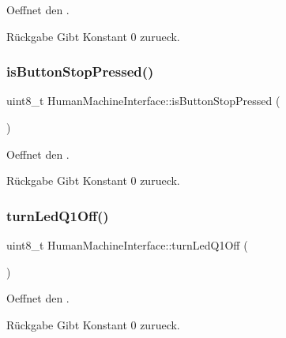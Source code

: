 Oeffnet den .

\begin{DoxyReturn}{Rückgabe}
Gibt Konstant 0 zurueck. 
\end{DoxyReturn}
\hypertarget{class_human_machine_interface_a6b150a5a2978b620a3823aaeda7e80b8}{}\label{class_human_machine_interface_a6b150a5a2978b620a3823aaeda7e80b8} 
\subsubsection{\texorpdfstring{is\+Button\+Stop\+Pressed()}{isButtonStopPressed()}}
{\footnotesize\ttfamily uint8\+\_\+t Human\+Machine\+Interface\+::is\+Button\+Stop\+Pressed (\begin{DoxyParamCaption}{ }\end{DoxyParamCaption})}

Oeffnet den .

\begin{DoxyReturn}{Rückgabe}
Gibt Konstant 0 zurueck. 
\end{DoxyReturn}
\hypertarget{class_human_machine_interface_a7d696c1803928a001bb98585f2ceb138}{}\label{class_human_machine_interface_a7d696c1803928a001bb98585f2ceb138} 
\subsubsection{\texorpdfstring{turn\+Led\+Q1\+Off()}{turnLedQ1Off()}}
{\footnotesize\ttfamily uint8\+\_\+t Human\+Machine\+Interface\+::turn\+Led\+Q1\+Off (\begin{DoxyParamCaption}{ }\end{DoxyParamCaption})}

Oeffnet den .

\begin{DoxyReturn}{Rückgabe}
Gibt Konstant 0 zurueck. 
\end{DoxyReturn}
\hypertarget{class_human_machine_interface_a0ba867b5493f024f53c1e00a1287aa6c}{}\label{class_human_machine_interface_a0ba867b5493f024f53c1e00a1287aa6c} 
